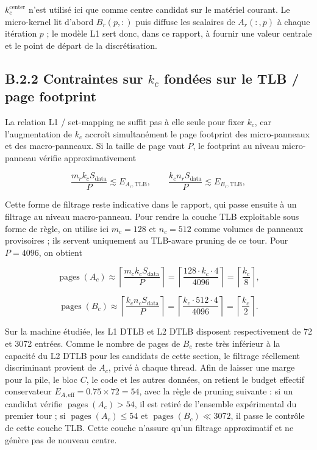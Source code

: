 \documentclass[a4paper,11pt,oneside]{article}
\begin{document}
$k_c^{\text{center}}$ n'est utilisé ici que comme centre candidat sur le matériel courant. Le micro-kernel lit d'abord $B_r(p,:)$ puis diffuse les scalaires de $A_r(:,p)$ à chaque itération $p$ ; le modèle L1 sert donc, dans ce rapport, à fournir une valeur centrale et le point de départ de la discrétisation.

\subsection*{B.2.2 Contraintes sur $k_c$ fondées sur le TLB / page footprint}

La relation L1 / set-mapping ne suffit pas à elle seule pour fixer $k_c$, car l'augmentation de $k_c$ accroît simultanément le page footprint des micro-panneaux et des macro-panneaux. Si la taille de page vaut $P$, le footprint au niveau micro-panneau vérifie approximativement

$$
\frac{m_r k_c S_{\text{data}}}{P} \lesssim E_{A_r,\mathrm{TLB}},
\qquad
\frac{k_c n_r S_{\text{data}}}{P} \lesssim E_{B_r,\mathrm{TLB}},
$$

Cette forme de filtrage reste indicative dans le rapport, qui passe ensuite à un filtrage au niveau macro-panneau. Pour rendre la couche TLB exploitable sous forme de règle, on utilise ici $m_c=128$ et $n_c=512$ comme volumes de panneaux provisoires ; ils servent uniquement au TLB-aware pruning de ce tour. Pour $P=4096$, on obtient

$$
\operatorname{pages}(A_c) \approx \left\lceil \frac{m_c k_c S_{\text{data}}}{P} \right\rceil
= \left\lceil \frac{128 \cdot k_c \cdot 4}{4096} \right\rceil
= \left\lceil \frac{k_c}{8} \right\rceil,
$$

$$
\operatorname{pages}(B_c) \approx \left\lceil \frac{k_c n_c S_{\text{data}}}{P} \right\rceil
= \left\lceil \frac{k_c \cdot 512 \cdot 4}{4096} \right\rceil
= \left\lceil \frac{k_c}{2} \right\rceil.
$$

Sur la machine étudiée, les L1 DTLB et L2 DTLB disposent respectivement de 72 et 3072 entrées. Comme le nombre de pages de $B_c$ reste très inférieur à la capacité du L2 DTLB pour les candidats de cette section, le filtrage réellement discriminant provient de $A_c$, privé à chaque thread. Afin de laisser une marge pour la pile, le bloc $C$, le code et les autres données, on retient le budget effectif conservateur $E_{A,\mathrm{eff}}=0.75 \times 72 = 54$, avec la règle de pruning suivante : si un candidat vérifie $\operatorname{pages}(A_c) > 54$, il est retiré de l'ensemble expérimental du premier tour ; si $\operatorname{pages}(A_c) \le 54$ et $\operatorname{pages}(B_c) \ll 3072$, il passe le contrôle de cette couche TLB. Cette couche n'assure qu'un filtrage approximatif et ne génère pas de nouveau centre.
\end{document}

